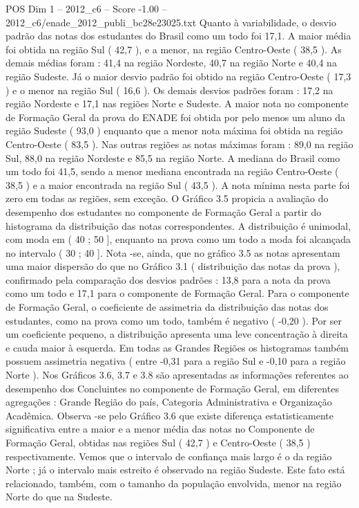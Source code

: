 \begin{textsample}{POS Dim 1 – 2012\_c6 – Score -1.00 – 2012\_c6/enade\_2012\_publi\_bc28e23025.txt}
Quanto à variabilidade, o desvio padrão das notas dos estudantes do Brasil como um todo foi 17,1.
A maior média foi obtida na região Sul ( 42,7 ), e a menor, na região Centro-Oeste ( 38,5 ).
As demais médias foram : 41,4 na região Nordeste, 40,7 na região Norte e 40,4 na região Sudeste.
Já o maior desvio padrão foi obtido na região Centro-Oeste ( 17,3 ) e o menor na região Sul ( 16,6 ).
Os demais desvios padrões foram : 17,2 na região Nordeste e 17,1 nas regiões Norte e Sudeste.
A maior nota no componente de Formação Geral da prova do ENADE foi obtida por pelo menos um aluno da região Sudeste ( 93,0 ) enquanto que a menor nota máxima foi obtida na região Centro-Oeste ( 83,5 ).
Nas outras regiões as notas máximas foram : 89,0 na região Sul, 88,0 na região Nordeste e 85,5 na região Norte.
A mediana do Brasil como um todo foi 41,5, sendo a menor mediana encontrada na região Centro-Oeste ( 38,5 ) e a maior encontrada na região Sul ( 43,5 ).
A nota mínima nesta parte foi zero em todas as regiões, sem exceção.
O Gráfico 3.5 propicia a avaliação do desempenho dos estudantes no componente de Formação Geral a partir do histograma da distribuição das notas correspondentes.
A distribuição é unimodal, com moda em ( 40 ; 50 ], enquanto na prova como um todo a moda foi alcançada no intervalo ( 30 ; 40 ].
Nota -se, ainda, que no gráfico 3.5 as notas apresentam uma maior dispersão do que no Gráfico 3.1 ( distribuição das notas da prova ), confirmado pela comparação dos desvios padrões : 13,8 para a nota da prova como um todo e 17,1 para o componente de Formação Geral.
Para o componente de Formação Geral, o coeficiente de assimetria da distribuição das notas dos estudantes, como na prova como um todo, também é negativo ( -0,20 ).
Por ser um coeficiente pequeno, a distribuição apresenta uma leve concentração à direita e cauda maior à esquerda.
Em todas as Grandes Regiões os histogramas também possuem assimetria negativa ( entre -0,31 para a região Sul e -0,10 para a região Norte ).
Nos Gráficos 3.6, 3.7 e 3.8 são apresentadas as informações referentes ao desempenho dos Concluintes no componente de Formação Geral, em diferentes agregações : Grande Região do país, Categoria Administrativa e Organização Acadêmica.
Observa -se pelo Gráfico 3.6 que existe diferença estatisticamente significativa entre a maior e a menor média das notas no Componente de Formação Geral, obtidas nas regiões Sul ( 42,7 ) e Centro-Oeste ( 38,5 ) respectivamente.
Vemos que o intervalo de confiança mais largo é o da região Norte ; já o intervalo mais estreito é observado na região Sudeste.
Este fato está relacionado, também, com o tamanho da população envolvida, menor na região Norte do que na Sudeste.

\end{textsample}
